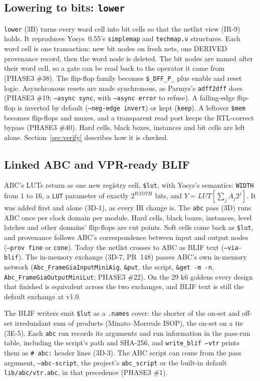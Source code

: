\documentclass[conference]{IEEEtran}
\newcommand{\code}[1]{\texttt{#1}}
\begin{document}
\subsection{Lowering to bits: \code{lower}}

\code{lower} (3B) turns every word cell into bit cells so that the netlist view (IR-9) holds.
It reproduces Yosys~0.55's \code{simplemap} and \code{techmap.v} structures. Each word cell is
one transaction: new bit nodes on fresh nets, one DERIVED provenance record, then the word node
is deleted. The bit nodes are named after their word cell, so a gate can be read back to the
operator it came from (PHASE3 \#38). The flip-flop family becomes \code{\$\_DFF\_P\_} plus
enable and reset logic. Asynchronous resets are made synchronous, as Parmys's \code{adff2dff}
does (PHASE3 \#19; \code{--async sync}, with \code{--async error} to refuse). A falling-edge
flip-flop is inverted by default (\code{--neg-edge invert}) or kept (\code{keep}). A leftover
\code{\$mem} becomes flip-flops and muxes, and a transparent read port keeps the RTL-correct
bypass (PHASE3 \#40). Hard cells, black boxes, instances and bit cells are left alone.
Section~\ref{sec:verify} describes how it is checked.

\subsection{Linked ABC and VPR-ready BLIF}
\label{sec:abc}

ABC's LUTs return as one new registry cell, \code{\$lut}, with Yosys's semantics: \code{WIDTH}
from 1 to 16, a \code{LUT} parameter of exactly $2^{\mathit{WIDTH}}$ bits, and
$Y = \mathit{LUT}[\sum_j A_j 2^j]$. It was added first and alone (3D-1), as every IR change
is. The \code{abc} pass (3D) runs ABC once per clock domain per module. Hard cells, black boxes,
instances, level latches and other domains' flip-flops are cut points. Soft cells come back as
\code{\$lut}, and provenance follows ABC's correspondence between input and output nodes
(\code{--prov fine} or \code{cone}). Today the netlist crosses to ABC as BLIF text
(\code{--via-blif}). The in-memory exchange (3D-7, PR~148) passes ABC's own in-memory network
(\code{Abc\_FrameGiaInputMiniAig}, \code{\&put}, the script, \code{\&get -m -n},
\code{Abc\_FrameGiaOutputMiniLut}; PHASE3 \#22). On the 29 k6 goldens every design that
finished is equivalent across the two exchanges, and BLIF text is still the default
exchange at v1.0.

The BLIF writers emit \code{\$lut} as a \code{.names} cover: the shorter of the on-set and
off-set irredundant sum of products (Minato--Morreale ISOP), the on-set on a tie (3E-5). Each
\code{abc} run records its arguments and run information in the pass-run table, including the
script's path and SHA-256, and \code{write\_blif --vtr} prints them as \code{\# abc:} header
lines (3D-3). The ABC script can come from the pass argument, \code{--abc-script}, the project's
\code{abc\_script} or the built-in default \code{lib/abc/vtr.abc}, in that precedence
(PHASE3 \#1).
\end{document}
